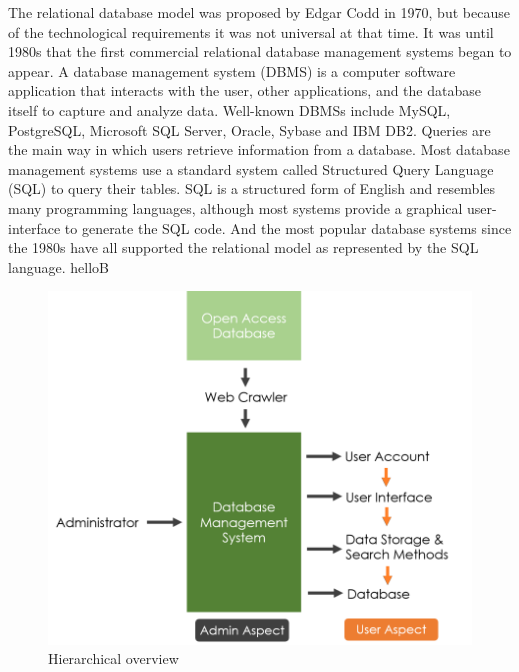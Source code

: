 The relational database model was proposed by Edgar Codd in 1970, but because of the technological requirements it was not universal at that time. It was until 1980s that the first commercial relational database management systems began to appear. 
A database management system (DBMS) is a computer software application that interacts with the user, other applications, and the database itself to capture and analyze data. Well-known DBMSs include MySQL, PostgreSQL, Microsoft SQL Server, Oracle, Sybase and IBM DB2. 
Queries are the main way in which users retrieve information from a database. Most database management systems use a standard system called Structured Query Language (SQL) to query their tables. SQL is a structured form of English and resembles many programming languages, although most systems provide a graphical user-interface to generate the SQL code. And the most popular database systems since the 1980s have all supported the relational model as represented by the SQL language.\cite{Martinez-Cruz2011} helloB	
	
\begin{figure}[h]
	\begin{center}
		\includegraphics[scale=1.0]{WolverineChart}
	\end{center}
	\caption{Hierarchical overview}
\end{figure}
\clearpage
